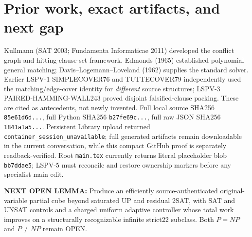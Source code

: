 \documentclass[10pt]{article}
\begin{document}
\section{Prior work, exact artifacts, and next gap}
Kullmann (SAT 2003; Fundamenta Informaticae 2011) developed the conflict graph and hitting-clause-set framework. Edmonds (1965) established polynomial general matching; Davis--Logemann--Loveland (1962) supplies the standard solver. Earlier LSPV-1 SIMPLECOVER76 and TUTTECOVER79 independently used the matching/edge-cover identity for \emph{different} source structures; LSPV-3 PAIRED-HAMMING-WALL243 proved disjoint falsified-clause packing. These are cited as antecedents, not newly invented. Full local source SHA256 \texttt{85e61d6d...}, full Python SHA256 \texttt{b27fe69c...}, full raw JSON SHA256 \texttt{1841a1a5...}. Persistent Library upload returned \texttt{container\_session\_unavailable}; full generated artifacts remain downloadable in the current conversation, while this compact GitHub proof is separately readback-verified. Root \texttt{main.tex} currently returns literal placeholder blob \texttt{bb7ddae5}; LSPV-5 must reconcile and restore ownership markers before any specialist main edit.

\noindent\textbf{NEXT OPEN LEMMA:} Produce an efficiently source-authenticated original-variable partial cube beyond saturated UP and residual 2SAT, with SAT and UNSAT controls and a charged uniform adaptive controller whose total work improves on a structurally recognizable infinite strict22 subclass. Both $P=NP$ and $P\ne NP$ remain OPEN.
\end{document}
